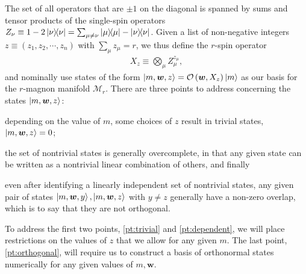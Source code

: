 \documentclass[nofootinbib,notitlepage,11pt]{revtex4-2}
\newcommand{\p}[1]{\left(#1\right)} %
\newcommand{\m}{\bm} %
\newcommand{\1}{\mathds{1}}
\newcommand{\M}{\mathcal{M}}
\renewcommand{\O}{\mathcal{O}}
\begin{document}
The set of all operators that are $\pm1$ on the diagonal is spanned by
sums and tensor products of the single-spin operators
$Z_\nu\equiv1-2\op\nu=\sum_{\mu\ne\nu}\op\mu-\op\nu$.  Given a list of
non-negative integers $z\equiv\p{z_1,z_2,\cdots,z_n}$ with
$\sum_\mu z_\mu=r$, we thus define the $r$-spin operator
\begin{align}
  X_z \equiv \bigotimes_\mu Z_\mu^{z_\mu},
\end{align}
and nominally use states of the form
$\ket{m,\m w,z}=\O\p{\m w,X_z}\ket{m}$ as our basis for the $r$-magnon
manifold $\M_r$.  There are three points to address concerning the
states $\ket{m,\m w,z}$:
\begin{enumerate*}
\item depending on the value of $m$, some choices of $z$ result in
  trivial states, $\ket{m,\m w,z}=0$;
  \label{pt:trivial}
\item the set of nontrivial states is generally overcomplete, in that
  any given state can be written as a nontrivial linear combination of
  others, and finally
  \label{pt:dependent}
\item even after identifying a linearly independent set of nontrivial
  states, any given pair of states $\ket{m,\m w,y},\ket{m,\m w,z}$
  with $y\ne z$ generally have a non-zero overlap, which is to say
  that they are not orthogonal.
  \label{pt:orthogonal}
\end{enumerate*}
To address the first two points, \ref{pt:trivial} and
\ref{pt:dependent}, we will place restrictions on the values of $z$
that we allow for any given $m$.  The last point, \ref{pt:orthogonal},
will require us to construct a basis of orthonormal states numerically
for any given values of $m,\m w$.
\end{document}

